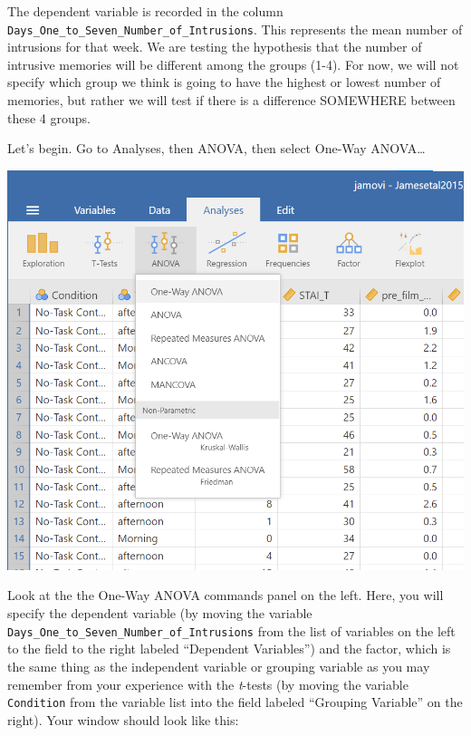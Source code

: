 \documentclass[
]{book}
\begin{document}
The dependent variable is recorded in the column \texttt{Days\_One\_to\_Seven\_Number\_of\_Intrusions}. This represents the mean number of intrusions for that week. We are testing the hypothesis that the number of intrusive memories will be different among the groups (1-4). For now, we will not specify which group we think is going to have the highest or lowest number of memories, but rather we will test if there is a difference SOMEWHERE between these 4 groups.

Let's begin. Go to {Analyses}, then {ANOVA}, then select {One-Way ANOVA\ldots{}}

\includegraphics{img/OneWayANOVACommands.png}

Look at the the One-Way ANOVA commands panel on the left. Here, you will specify the dependent variable (by moving the variable \texttt{Days\_One\_to\_Seven\_Number\_of\_Intrusions} from the list of variables on the left to the field to the right labeled ``Dependent Variables'') and the factor, which is the same thing as the independent variable or grouping variable as you may remember from your experience with the \emph{t}-tests (by moving the variable \texttt{Condition} from the variable list into the field labeled ``Grouping Variable'' on the right). Your window should look like this:
\end{document}
